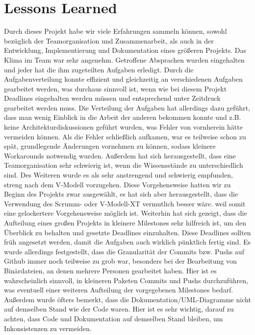 \documentclass[oneside,a4paper,titlepage]{scrartcl} %
\begin{document}
\section{Lessons Learned}

Durch dieses Projekt habe wir viele Erfahrungen sammeln können, sowohl bezüglich der  Teamorganisation und Zusammenarbeit, als auch in der Entwicklung, Implementierung und Dokumentation eines  größeren Projekts.\newline
Das Klima im Team war sehr angenehm. Getroffene Absprachen wurden eingehalten und jeder hat die ihm zugeteilten Aufgaben erledigt.\newline
Durch die Aufgabenverteilung konnte effizient und gleichzeitig an verschiedenen Aufgaben gearbeitet werden, was durchaus sinnvoll ist, wenn wie bei diesem Projekt Deadlines eingehalten werden müssen und entsprechend unter Zeitdruck gearbeitet werden muss. \newline
Die Verteilung der Aufgaben hat allerdings dazu geführt, dass man wenig Einblick in die Arbeit der anderen bekommen konnte und z.B. keine Architekturdiskussionen geführt wurden, was Fehler von vornherein hätte vermeiden können. Als die Fehler schließlich aufkamen, war es teilweise schon zu spät, grundlegende Änderungen vornehmen zu können, sodass kleinere Workarounds notwendig wurden. \newline
Außerdem hat sich herausgestellt, dass eine Teamorganisation sehr schwierig ist, wenn die Wissensstände zu unterschiedlich sind. \newline
Des Weiteren wurde es als sehr anstrengend und schwierig empfunden, streng nach dem V-Modell vorzugehen. Diese Vorgehensweise hatten wir zu Beginn des Projekts zwar ausgewählt, es hat sich aber herausgestellt, dass die Verwendung des Scrumm- oder V-Modell-XT vermutlich besser wäre. weil somit eine gelockertere Vorgehensweise möglich ist.\newline
Weiterhin hat sich gezeigt, dass die Aufteilung eines großen Projekts in kleinere Milestones sehr hilfreich ist, um den Überblick zu behalten und gesetzte Deadlines einzuhalten. Diese Deadlines sollten früh angesetzt werden, damit die Aufgaben auch wirklich pünktlich fertig sind.\newline
Es wurde allerdings festgestellt, dass die Granularität der Commits bzw. Pushs auf Github  immer noch teilweise zu grob war, besonders bei der Bearbeitung von Binärdateien, an denen mehrere Personen gearbeitet haben. Hier ist es wahrscheinlich sinnvoll, in kleineren Paketen Commits und Pushs durchzuführen, was eventuell einer weiteren Aufteilung der vorgegebenen Milestones bedarf. \newline
Außerdem wurde öfters bemerkt, dass die Dokumentation/UML-Diagramme nicht auf demselben Stand wie der Code waren. Hier ist es sehr wichtig, darauf zu achten, dass Code und Dokumentation auf demselben Stand bleiben, um Inkonsistenzen zu vermeiden.\newline
\end{document}
